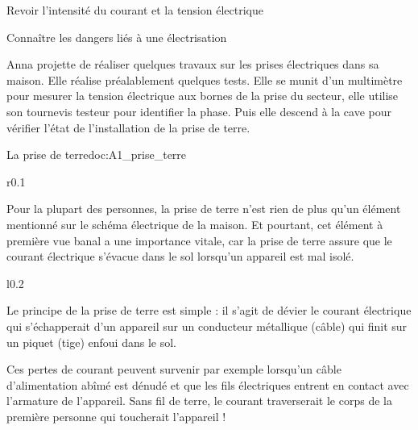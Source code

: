 \tetePremStssElec

\vspace*{-36pt}


\begin{objectifs}
  \item Revoir l'intensité du courant et la tension électrique
  \item Connaître les dangers liés à une électrisation
\end{objectifs}

\begin{contexte}
  Anna projette de réaliser quelques travaux sur les prises électriques dans sa maison.
  Elle réalise préalablement quelques tests. 
  Elle se munit d'un multimètre pour mesurer la tension électrique aux bornes de la prise du secteur, elle utilise son tournevis testeur pour identifier la phase.
  Puis elle descend à la cave pour vérifier l'état de l'installation de la prise de terre.
  
\end{contexte}


\begin{doc}{La prise de terre}{doc:A1_prise_terre}
  \begin{wrapfigure}{r}{0.1\linewidth}
    \centering
    \vspace*{-30pt}
  \end{wrapfigure}
  Pour la plupart des personnes, la prise de terre n'est rien de plus qu'un élément mentionné sur le schéma électrique de la maison.
  Et pourtant, cet élément à première vue banal a une importance vitale, car la prise de terre assure que le courant électrique s'évacue dans le sol lorsqu'un appareil est mal isolé.

  \begin{wrapfigure}{l}{0.2\linewidth}
  \end{wrapfigure}

  Le principe de la prise de terre est simple : il s'agit de dévier le courant électrique qui s'échapperait d'un appareil sur un conducteur métallique (câble) qui finit sur un piquet (tige) enfoui dans le sol.

  Ces pertes de courant peuvent survenir par exemple lorsqu'un câble d'alimentation abîmé est dénudé et que les fils électriques entrent en contact avec l'armature de l'appareil.
  Sans fil de terre, le courant traverserait le corps de la première personne qui toucherait l'appareil !
\end{doc}

